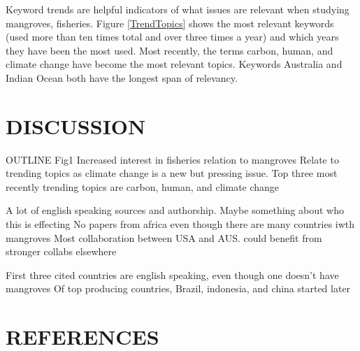 \documentclass[
  12pt,
]{article}
\begin{document}
Keyword trends are helpful indicators of what issues are relevant when studying mangroves, fisheries. Figure \ref{TrendTopics} shows the most relevant keywords (used more than ten times total and over three times a year) and which years they have been the most used. Most recently, the terms carbon, human, and climate change have become the most relevant topics. Keywords Australia and Indian Ocean both have the longest span of relevancy.

\hypertarget{discussion}{%
\section{DISCUSSION}\label{discussion}}

OUTLINE
Fig1 Increased interest in fisheries relation to mangroves
Relate to trending topics as climate change is a new but pressing issue. Top three most recently trending topics are carbon, human, and climate change

A lot of english speaking sources and authorship. Maybe something about who this is effecting
No papers from africa even though there are many countries iwth mangroves
Most collaboration between USA and AUS. could benefit from stronger collabs elsewhere

First three cited countries are english speaking, even though one doesn't have mangroves
Of top producing countries, Brazil, indonesia, and china started later

\newpage

\hypertarget{references}{%
\section*{REFERENCES}\label{references}}
\end{document}
